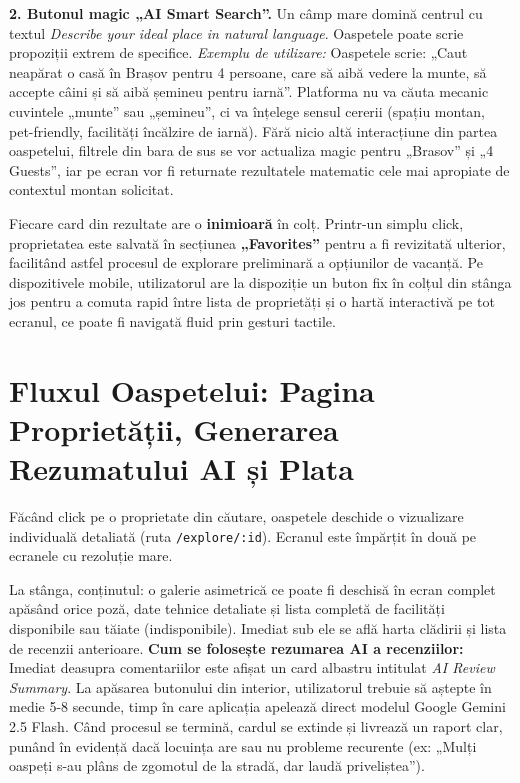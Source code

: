 \documentclass[12pt,a4paper,oneside]{report}
\begin{document}
\textbf{2. Butonul magic „AI Smart Search''.} 
Un câmp mare domină centrul cu textul \textit{Describe your ideal place in natural language}. Oaspetele poate scrie propoziții extrem de specifice.
\textit{Exemplu de utilizare:} Oaspetele scrie: „Caut neapărat o casă în Brașov pentru 4 persoane, care să aibă vedere la munte, să accepte câini și să aibă șemineu pentru iarnă''. 
Platforma nu va căuta mecanic cuvintele „munte'' sau „șemineu'', ci va înțelege sensul cererii (spațiu montan, pet-friendly, facilități încălzire de iarnă). Fără nicio altă interacțiune din partea oaspetelui, filtrele din bara de sus se vor actualiza magic pentru „Brasov'' și „4 Guests'', iar pe ecran vor fi returnate rezultatele matematic cele mai apropiate de contextul montan solicitat.

Fiecare card din rezultate are o \textbf{inimioară} în colț. Printr-un simplu click, proprietatea este salvată în secțiunea \textbf{„Favorites''} pentru a fi revizitată ulterior, facilitând astfel procesul de explorare preliminară a opțiunilor de vacanță. Pe dispozitivele mobile, utilizatorul are la dispoziție un buton fix în colțul din stânga jos pentru a comuta rapid între lista de proprietăți și o hartă interactivă pe tot ecranul, ce poate fi navigată fluid prin gesturi tactile.

\section{Fluxul Oaspetelui: Pagina Proprietății, Generarea Rezumatului AI și Plata}

Făcând click pe o proprietate din căutare, oaspetele deschide o vizualizare individuală detaliată (ruta \texttt{/explore/:id}). Ecranul este împărțit în două pe ecranele cu rezoluție mare.

La stânga, conținutul: o galerie asimetrică ce poate fi deschisă în ecran complet apăsând orice poză, date tehnice detaliate și lista completă de facilități disponibile sau tăiate (indisponibile). Imediat sub ele se află harta clădirii și lista de recenzii anterioare.
\textbf{Cum se folosește rezumarea AI a recenziilor:} Imediat deasupra comentariilor este afișat un card albastru intitulat \textit{AI Review Summary}. La apăsarea butonului din interior, utilizatorul trebuie să aștepte în medie 5-8 secunde, timp în care aplicația apelează direct modelul Google Gemini 2.5 Flash. Când procesul se termină, cardul se extinde și livrează un raport clar, punând în evidență dacă locuința are sau nu probleme recurente (ex: „Mulți oaspeți s-au plâns de zgomotul de la stradă, dar laudă priveliștea'').
\end{document}
